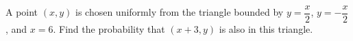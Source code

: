 A point $(x,y)$ is chosen uniformly from the triangle bounded by $y=\dfrac{x}{2}$, $y=-\dfrac{x}{2}$, and $x=6$. Find the probability that $(x+3,y)$ is also in this triangle.
